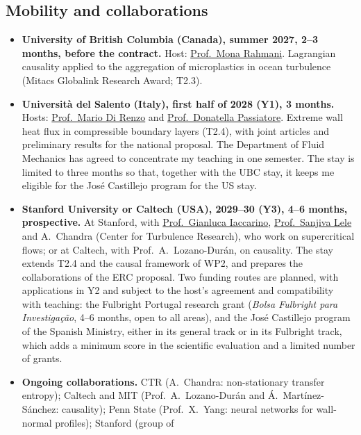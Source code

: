 \documentclass[11pt]{article}
\begin{document}
\subsection{Mobility and collaborations}\label{sec:mobility}
\begin{itemize}
  \item \textbf{University of British Columbia (Canada), summer 2027, 2--3 months, before the
  contract.} Host: \href{https://chbe.ubc.ca/mona-rahmani/}{Prof.\ Mona Rahmani}. Lagrangian
  causality applied to the aggregation of microplastics in ocean turbulence (Mitacs Globalink
  Research Award; T2.3).
  \item \textbf{Universit\`a del Salento (Italy), first half of 2028 (Y1), 3 months.} Hosts:
  \href{https://www.unisalento.it/scheda-utente/-/people/mario.direnzo}{Prof.\ Mario Di Renzo}
  and \href{https://www.unisalento.it/scheda-utente/-/people/donatella.passiatore}{Prof.\
  Donatella Passiatore}. Extreme wall heat flux in compressible boundary layers (T2.4), with
  joint articles and preliminary results for the national proposal. The Department of Fluid
  Mechanics has agreed to concentrate my teaching in one semester. The stay is limited to
  three months so that, together with the UBC stay, it keeps me eligible for the José
  Castillejo program for the US stay.
  \item \textbf{Stanford University or Caltech (USA), 2029--30 (Y3), 4--6 months,
  prospective.} At Stanford, with
  \href{https://me.stanford.edu/people/gianluca-iaccarino}{Prof.\ Gianluca Iaccarino},
  \href{https://me.stanford.edu/people/sanjiva-lele}{Prof.\ Sanjiva Lele} and A.\ Chandra
  (Center for Turbulence Research), who work on supercritical flows; or at Caltech, with
  Prof.\ A.\ Lozano-Dur\'an, on causality. The stay extends T2.4 and the causal framework of
  WP2, and prepares the collaborations of the ERC proposal. Two funding routes are planned,
  with applications in Y2 and subject to the host's agreement and compatibility with
  teaching: the Fulbright Portugal research grant (\emph{Bolsa Fulbright para
  Investiga\c{c}\~ao}, 4--6 months, open to all areas), and the José Castillejo program of the
  Spanish Ministry, either in its general track or in its Fulbright track, which adds a minimum
  score in the scientific evaluation and a limited number of grants.
  \item \textbf{Ongoing collaborations.} CTR (A.\ Chandra: non-stationary transfer entropy);
  Caltech and MIT (Prof.\ A.\ Lozano-Dur\'an and \'A.\ Mart\'inez-S\'anchez: causality);
  Penn State (Prof.\ X.\ Yang: neural networks for wall-normal profiles); Stanford (group of

\end{itemize}
\end{document}
